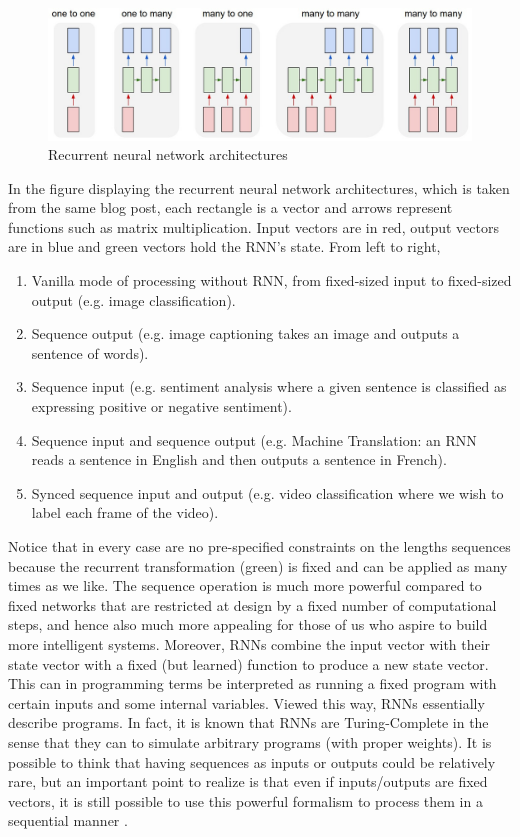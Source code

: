 \documentclass[conference, onecolumn, a4, 12pt]{IEEEtran}
\begin{document}
\begin{figure}
	\centering
	\includegraphics[width=0.7\linewidth]{recurrent_neural_network}
	\caption{Recurrent neural network architectures}
	\label{fig:recurrentneuralnetwork}
\end{figure}

In the figure displaying the recurrent neural network architectures, which is taken from the same blog post, each rectangle is a vector and arrows represent functions such as matrix multiplication. Input vectors are in red, output vectors are in blue and green vectors hold the RNN's state. From left to right, 
\begin{enumerate}
	\item Vanilla mode of processing without RNN, from fixed-sized input to fixed-sized output (e.g. image classification).
	\item Sequence output (e.g. image captioning takes an image and outputs a sentence of words).
	\item Sequence input (e.g. sentiment analysis where a given sentence is classified as expressing positive or negative sentiment).
	\item Sequence input and sequence output (e.g. Machine Translation: an RNN reads a sentence in English and then outputs a sentence in French).
	\item Synced sequence input and output (e.g. video classification where we wish to label each frame of the video).
\end{enumerate}
Notice that in every case are no pre-specified constraints on the lengths sequences because the recurrent transformation (green) is fixed and can be applied as many times as we like. The sequence operation is much more powerful compared to fixed networks that are restricted at design by a fixed number of computational steps, and hence also much more appealing for those of us who aspire to build more intelligent systems. Moreover, RNNs combine the input vector with their state vector with a fixed (but learned) function to produce a new state vector. This can in programming terms be interpreted as running a fixed program with certain inputs and some internal variables. Viewed this way, RNNs essentially describe programs. In fact, it is known that RNNs are Turing-Complete in the sense that they can to simulate arbitrary programs (with proper weights). It is possible to think that having sequences as inputs or outputs could be relatively rare, but an important point to realize is that even if inputs/outputs are fixed vectors, it is still possible to use this powerful formalism to process them in a sequential manner \cite{a11}.\newline
\end{document}
